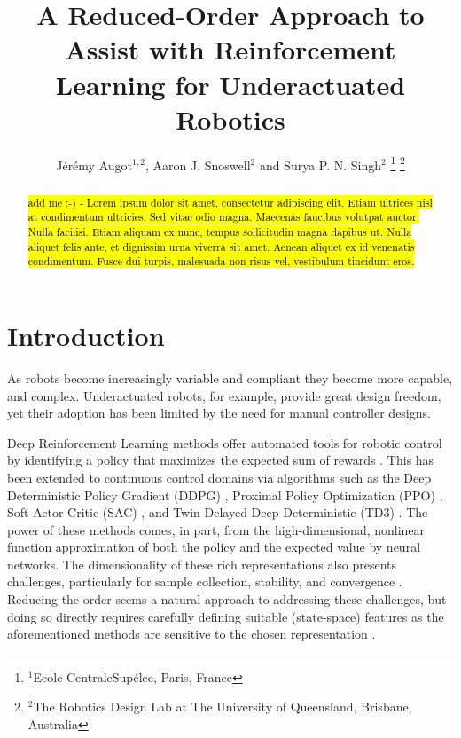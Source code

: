 \documentclass[letterpaper, 10 pt, conference]{ieeeconf}
\title{
    \LARGE \bf%
    A Reduced-Order Approach to Assist with Reinforcement Learning for Underactuated Robotics
}
\author{
    J\'er\'emy Augot$^{1,2}$, Aaron J. Snoswell$^{2}$ and Surya P. N. Singh$^{2}$
    \thanks{
        $^{1}$Ecole CentraleSup\'elec, Paris, France
    }%
    \thanks{
        $^{2}$The Robotics Design Lab at The University of Queensland, Brisbane, Australia
    }%
}
\begin{document}
\maketitle
\thispagestyle{empty}
\pagestyle{empty}

\begin{abstract}

\hl{add me :-) - Lorem ipsum dolor sit amet, consectetur adipiscing elit. Etiam ultrices nisl at condimentum ultricies. Sed vitae odio magna. Maecenas faucibus volutpat auctor. Nulla facilisi. Etiam aliquam ex nunc, tempus sollicitudin magna dapibus ut. Nulla aliquet felis ante, et dignissim urna viverra sit amet. Aenean aliquet ex id venenatis condimentum. Fusce dui turpis, malesuada non risus vel, vestibulum tincidunt eros.}

\end{abstract}

\section{Introduction}

As robots become increasingly variable and compliant they become more capable, and complex.
Underactuated robots, for example, provide great design freedom, yet their adoption has been limited by the need for manual controller designs.

Deep Reinforcement Learning methods offer automated tools for robotic control by identifying a policy that maximizes the expected sum of rewards \cite{henderson2018deep}.
This has been extended to continuous control domains via algorithms such as the Deep Deterministic Policy Gradient (DDPG) \cite{DDPG}, Proximal Policy Optimization (PPO) \cite{PPO}, Soft Actor-Critic (SAC) \cite{SAC}, and Twin Delayed Deep Deterministic (TD3) \cite{TD3}.
The power of these methods comes, in part, from the high-dimensional, nonlinear function approximation of both the policy and the expected value by neural networks.
The dimensionality of these rich representations also presents challenges, particularly for sample collection, stability, and convergence \cite{Islam2017}.
Reducing the order seems a natural approach to addressing these challenges, but doing so directly requires carefully defining suitable (state-space) features as the aforementioned methods are sensitive to the chosen representation \cite{bhatnagar2009convergent}. 
\end{document}
